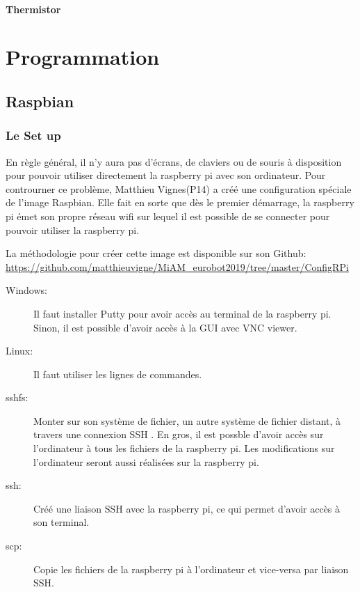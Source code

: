 \documentclass[a4paper, 11pt]{report}
\begin{document}
\subsection{Thermistor}

\part{Programmation}

\chapter{Raspbian}

\section{Le Set up}
En règle général, il n'y aura pas d'écrans, de claviers ou de souris à disposition pour pouvoir utiliser directement la raspberry pi avec son ordinateur. Pour controurner ce problème, Matthieu Vignes(P14) a créé une configuration spéciale de l'image Raspbian.  Elle fait en sorte que dès le premier démarrage, la raspberry pi émet son propre réseau wifi sur lequel il est possible de se connecter pour pouvoir utiliser la raspberry pi.

La méthodologie pour créer cette image est disponible sur son Github:
\url{https://github.com/matthieuvigne/MiAM_eurobot2019/tree/master/ConfigRPi}

\begin{description}
\item[Windows:]Il faut installer Putty pour avoir accès au terminal de la raspberry pi. Sinon, il est possible d'avoir accès à la GUI avec VNC viewer.
\item[Linux:]Il faut utiliser les lignes de commandes.
\end{description}

\begin{description}
\item[sshfs:]Monter sur son système de fichier, un autre système de fichier distant, à travers une connexion SSH . En gros, il est possble d'avoir accès sur l'ordinateur à tous les fichiers de la raspberry pi. Les modifications sur l'ordinateur seront aussi réalisées sur la raspberry pi.
\item[ssh:]Créé une liaison SSH avec la raspberry pi, ce qui permet d'avoir accès à son terminal.
\item[scp:]Copie les fichiers de la raspberry pi à l'ordinateur et vice-versa par liaison SSH. 
\end{description}
\end{document}
